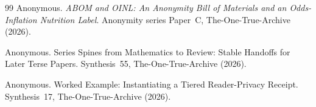 \documentclass[11pt]{article}
\theoremstyle{definition}
\theoremstyle{remark}
\begin{document}
\begin{thebibliography}{99}
Anonymous.
\newblock \emph{ABOM and OINL: An Anonymity Bill of Materials and an Odds-Inflation Nutrition Label}.
\newblock Anonymity series Paper~C, The-One-True-Archive (2026).

Anonymous.
\newblock Series Spines from Mathematics to Review: Stable Handoffs for Later Terse Papers.
\newblock Synthesis~55, The-One-True-Archive (2026).

Anonymous.
\newblock Worked Example: Instantiating a Tiered Reader-Privacy Receipt.
\newblock Synthesis~17, The-One-True-Archive (2026).

\end{thebibliography}
\end{document}
